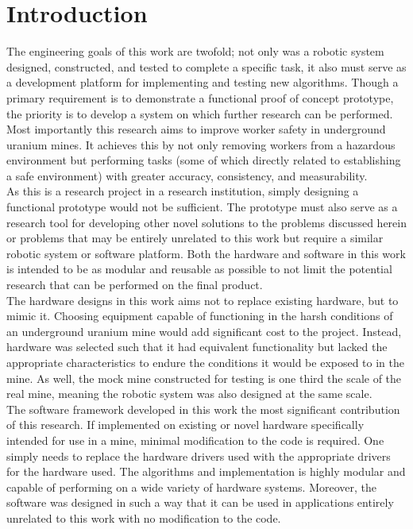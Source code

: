 \chapter{Introduction}
\label{chap:introduction}

The engineering goals of this work are twofold; not only was a robotic system designed, constructed, and tested to complete a specific task, it also must serve as a development platform for implementing and testing new algorithms. Though a primary requirement is to demonstrate a functional proof of concept prototype, the priority is to develop a system on which further research can be performed.\\

Most importantly this research aims to improve worker safety in underground uranium mines. It achieves this by not only removing workers from a hazardous environment but performing tasks (some of which directly related to establishing a safe environment) with greater accuracy, consistency, and measurability.\\

As this is a research project in a research institution, simply designing a functional prototype would not be sufficient. The prototype must also serve as a research tool for developing other novel solutions to the problems discussed herein or problems that may be entirely unrelated to this work but require a similar robotic system or software platform. Both the hardware and software in this work is intended to be as modular and reusable as possible to not limit the potential research that can be performed on the final product.\\

The hardware designs in this work aims not to replace existing hardware, but to mimic it. Choosing equipment capable of functioning in the harsh conditions of an underground uranium mine would add significant cost to the project. Instead, hardware was selected such that it had equivalent functionality but lacked the appropriate characteristics to endure the conditions it would be exposed to in the mine. As well, the mock mine constructed for testing is one third the scale of the real mine, meaning the robotic system was also designed at the same scale.\\

The software framework developed in this work the most significant contribution of this research. If implemented on existing or novel hardware specifically intended for use in a mine, minimal modification to the code is required. One simply needs to replace the hardware drivers used with the appropriate drivers for the hardware used. The algorithms and implementation is highly modular and capable of performing on a wide variety of hardware systems. Moreover, the software was designed in such a way that it can be used in applications entirely unrelated to this work with no modification to the code.\\

